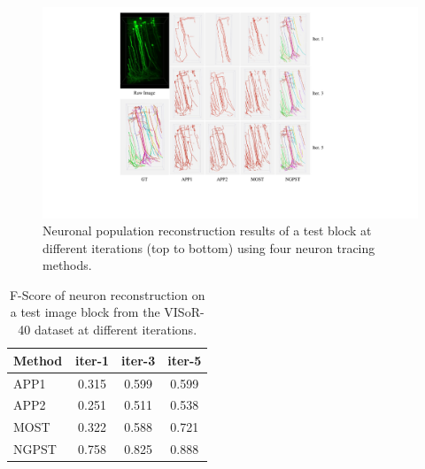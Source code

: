 \begin{figure}[t]
	\centering
	\includegraphics[width=1\columnwidth]{./Illustrations/trace_iterations3.pdf}
	\caption{Neuronal population reconstruction results of a test block at different iterations (top to bottom) using four neuron tracing methods.} 
	\label{fig:trace_iterations}
\end{figure}

\begin{table}[t]
	\centering
	\caption{F-Score of neuron reconstruction on a test image block from the VISoR-40 dataset at different iterations.%
	}
	\label{table:trace_iterations}
	\begin{tabular}{lccc}
		\toprule
		Method & iter-1 & iter-3 & iter-5\\
		\midrule
		APP1~\cite{Peng2011}
		& 0.315 & 0.599 & 0.599\\
		APP2~\cite{Xiao2013}
		& 0.251 & 0.511 & 0.538\\
		MOST~\cite{Wu2014}          
		& 0.322 & 0.588 & 0.721\\
		NGPST~\cite{Quan2015}
		& 0.758 & 0.825 & 0.888\\
		\bottomrule
	\end{tabular}
\end{table}

